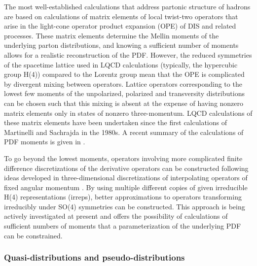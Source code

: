 The most well-established calculations that address partonic structure of hadrons are based on calculations of matrix elements of local twist-two operators that arise in the light-cone operator product expansion (OPE) of DIS and related processes. These matrix elements determine the Mellin moments of the underlying parton distributions, and knowing a sufficient number of moments allows for a realistic reconstruction of the PDF. However, the reduced symmetries of the spacetime lattice used in LQCD calculations (typically, the hypercubic group H(4)) compared to the Lorentz group mean that the OPE is complicated by divergent mixing between operators.
Lattice operators corresponding to the lowest few moments of the unpolarized, polarized and transversity distributions can be chosen such that this mixing is absent at the expense of having nonzero matrix elements only in states of nonzero three-momentum. LQCD calculations of these matrix elements have been undertaken since the first calculations of Martinelli and Sachrajda \cite{Dawson:1997ic} in the 1980s. A recent summary of the calculations of PDF moments is given in \cite{Lin:2017snn}.
	
To go beyond the lowest moments, operators involving more complicated finite difference discretizations of the derivative operators can be constructed following ideas developed in three-dimensional discretizations of interpolating operators of fixed angular momentum \cite{}. By using multiple different copies of given irreducible H(4) representations (irreps), better approximations to operators transforming irreducibly under SO(4) symmetries can be constructed. This approach is being actively investigated at present and offers the possibility of calculations of sufficient numbers of moments that a parameterization of the underlying PDF can be constrained.



\subsubsection{Quasi-distributions and pseudo-distributions}


